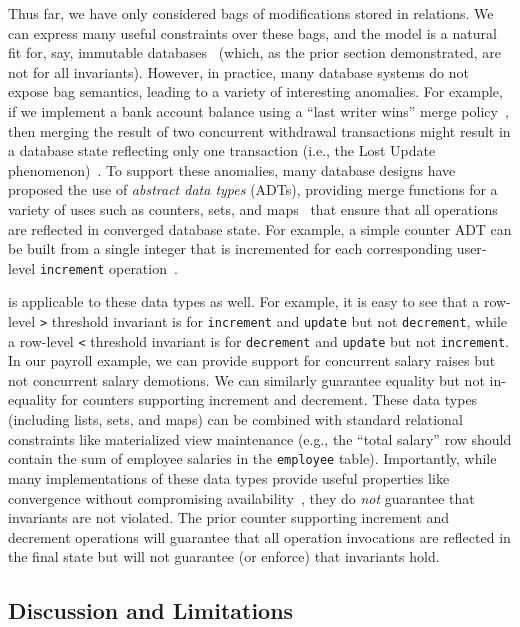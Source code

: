 Thus far, we have only considered bags of modifications stored in
relations. We can express many useful constraints over these bags, and
the model is a natural fit for, say, immutable
databases~\cite{gray-virtues} (which, as the prior section
demonstrated, are not \iconfluent for all invariants). However, in
practice, many database systems do not expose bag semantics, leading
to a variety of interesting anomalies. For example, if we implement a
bank account balance using a ``last writer wins'' merge
policy~\cite{vogels-defs}, then merging the result of two concurrent
withdrawal transactions might result in a database state reflecting
only one transaction (i.e., the Lost Update
phenomenon)~\cite{adya-isolation,hat-vldb}. To support these
anomalies, many database designs have proposed the use of
\textit{abstract data types} (ADTs), providing merge functions for a
variety of uses such as counters, sets, and
maps~\cite{crdt,atomictransactions,weihl-thesis,blooml} that ensure
that all operations are reflected in converged database state. For
example, a simple counter ADT can be built from a single integer that
is incremented for each corresponding user-level \texttt{increment}
operation~\cite{crdt}.

\iconfluence is applicable to these data types as well. For example,
it is easy to see that a row-level \texttt{>} threshold invariant is
\iconfluent for \texttt{increment} and \texttt{update} but not
\texttt{decrement}, while a row-level \texttt{<} threshold invariant
is \iconfluent for \texttt{decrement} and \texttt{update} but not
\texttt{increment}. In our payroll example, we can provide \cfree
support for concurrent salary raises but not concurrent salary
demotions. We can similarly guarantee equality but not in-equality for
counters supporting increment and decrement. These data types
(including lists, sets, and maps) can be combined with standard
relational constraints like materialized view maintenance (e.g., the
``total salary'' row should contain the sum of employee salaries in
the \texttt{employee} table). Importantly, while many implementations
of these data types provide useful properties like convergence without
compromising availability~\cite{blooml,crdt}, they do \textit{not}
guarantee that invariants are not violated. The prior counter
supporting increment and decrement operations will guarantee that all
operation invocations are reflected in the final state but will not
guarantee (or enforce) that invariants hold.

\subsection{Discussion and Limitations}

